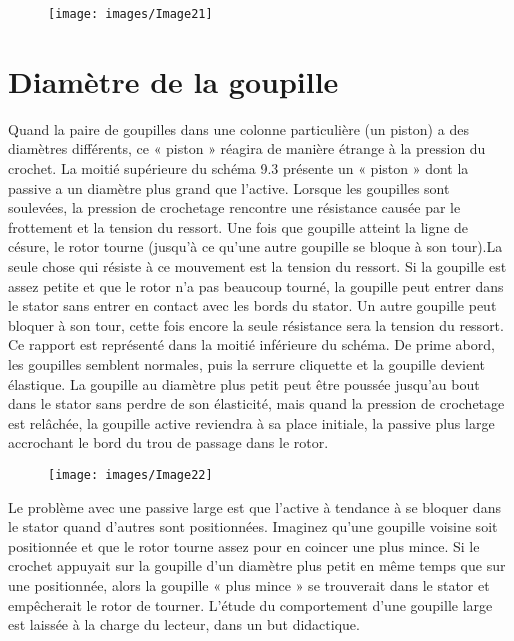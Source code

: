 \documentclass[a4paper,french,11pt,twoside]{report}
\begin{document}
\begin{figure}[ht] \begin{center}
        \texttt{[image: images/Image21]}
        \caption{}
\end{center} \end{figure}

\section{Diamètre de la goupille}

Quand la paire de goupilles dans une colonne particulière (un piston) a des diamètres différents, ce « piston » réagira de manière étrange à la pression du crochet. La moitié supérieure du schéma 9.3 présente un « piston » dont la passive a un diamètre plus grand que l'active. Lorsque les goupilles sont soulevées, la pression de crochetage rencontre une résistance causée par le frottement et la tension du ressort. Une fois que goupille atteint la ligne de césure, le rotor tourne (jusqu'à ce qu'une autre goupille se bloque à son tour).La seule chose qui résiste à ce mouvement est la tension du ressort. Si la goupille est assez petite et que le rotor n'a pas beaucoup tourné, la goupille peut entrer dans le stator sans entrer en contact avec les bords du stator. Un autre goupille peut bloquer à son tour, cette fois encore la seule résistance sera la tension du ressort. Ce rapport est représenté dans la moitié inférieure du schéma. De prime abord, les goupilles semblent normales, puis la serrure cliquette et la goupille devient élastique. La goupille au diamètre plus petit peut être poussée jusqu'au bout dans le stator sans perdre de son élasticité, mais quand la pression de crochetage est relâchée, la goupille active reviendra à sa place initiale, la passive plus large accrochant le bord du trou de passage dans le rotor.

\begin{figure}[ht] \begin{center}
        \texttt{[image: images/Image22]}
        \caption{}
\end{center} \end{figure}

Le problème avec une passive large est que l'active à tendance à se bloquer dans le stator quand d'autres sont positionnées. Imaginez qu'une goupille voisine soit positionnée et que le rotor tourne assez pour en coincer une plus mince. Si le crochet appuyait sur la goupille d'un diamètre plus petit en même temps que sur une positionnée, alors la goupille « plus mince » se trouverait dans le stator et empêcherait le rotor de tourner. L'étude du comportement d'une goupille large est laissée à la charge du lecteur, dans un but didactique.
\end{document}
